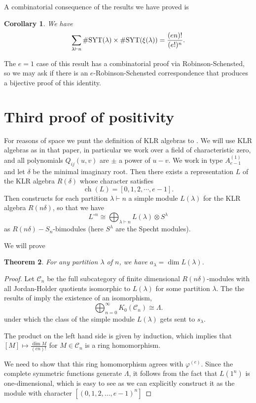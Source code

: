 \documentclass[11pt]{amsart}
\newcommand\la{\lambda}
\newcommand\La{\Lambda}
\newtheorem{theo}{Theorem}[section]
\newtheorem{cor}[theo]{Corollary}
\theoremstyle{definition}
\numberwithin{equation}{section}
\begin{document}
A combinatorial consequence of the results we have proved is


\begin{cor}
We have
\[
\sum_{\la\vdash n} \# {\rm SYT}(\lambda) \times \# {\rm SYT}(\xi(\lambda)) = \frac{(en)!}{(e!)^n}.
\]
\end{cor}

The $e=1$ case of this result has a combinatorial proof via Robinson-Schensted, so we may ask if there is an $e$-Robinson-Schensted correspondence that produces a bijective proof of this identity.

\section{Third proof of positivity\label{sec:klr}}

For reasons of space we punt the definition of KLR algebras to \cite{klr3}. We will use KLR algebras as in that paper, in particular we work over a field of characteristic zero, and all polynomials $Q_{ij}(u,v)$ are $\pm$ a power of $u-v$. We work in type $A_{e-1}^{(1)}$ and let $\delta$ be the minimal imaginary root. Then there exists a representation $L$ of the KLR algebra $R(\delta)$ whose character satisfies
\[
\operatorname{ch}(L)=[0,1,2,\cdots,e-1].
\]
Then \cite[\S 17]{klr3} constructs for each partition $\lambda\vdash n$ a simple module $L(\la)$ for the KLR algebra $R(n\delta)$, so that we have
\[
L^{\circ n} \cong \bigoplus_{\la\vdash n} L(\la) \otimes S^{\la}
\]
as $R(n\delta)-S_n$-bimodules (here $S^\la$ are the Specht modules).

We will prove
\begin{theo}
For any partition $\la$ of $n$, we have $a_\la = \dim L(\la)$.
\end{theo}
 
\begin{proof}
Let $\mathcal{C}_n$ be the full subcategory of finite dimensional $R(n\delta)$-modules with all Jordan-Holder quotients isomorphic to $L(\la)$ for some partition $\la$. The the results of \cite{klr3} imply the existence of an isomorphism,
\[
\bigoplus_{n=0}^{\infty} K_0(\mathcal{C}_n) \cong \La.
\]
under which the class of the simple module $L(\la)$ gets sent to $s_{\la}$.

The product on the left hand side is given by induction, which implies that $[M]\mapsto \frac{\dim M}{(en)!}$ for $M\in \mathcal{C}_n$ is a ring homomorphism.

We need to show that this ring homomorphism agrees with $\varphi^{(e)}$. Since the complete symmetric functions generate $\Lambda$, it follows from the fact that $L(1^n)$ is one-dimensional, which is easy to see as we can explicitly construct it as the module with character $[(0,1,2,\ldots,e-1)^n]$
\end{proof} 
 
\end{document}

